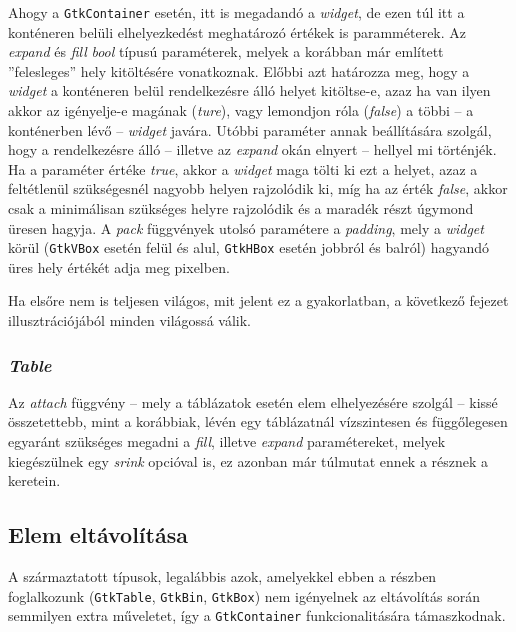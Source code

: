 Ahogy a \texttt{GtkContainer} esetén, itt is megadandó a \textit{widget}, de ezen túl itt a konténeren belüli elhelyezkedést meghatározó értékek is paramméterek. Az \textit{expand} és \textit{fill} \textit{bool} típusú paraméterek, melyek a korábban már említett ''felesleges'' hely kitöltésére vonatkoznak. Előbbi azt határozza meg, hogy a \textit{widget} a konténeren belül rendelkezésre álló helyet kitöltse-e, azaz ha van ilyen akkor az igényelje-e magának (\textit{ture}), vagy lemondjon róla (\textit{false}) a többi -- a konténerben lévő -- \textit{widget} javára. Utóbbi paraméter annak beállítására szolgál, hogy a rendelkezésre álló -- illetve az \textit{expand} okán elnyert -- hellyel mi történjék. Ha a paraméter értéke \textit{true}, akkor a \textit{widget} maga tölti ki ezt a helyet, azaz a feltétlenül szükségesnél nagyobb helyen rajzolódik ki, míg ha az érték \textit{false}, akkor csak a minimálisan szükséges helyre rajzolódik és a maradék részt úgymond üresen hagyja. A \textit{pack} függvények utolsó paramétere a \textit{padding}, mely a \textit{widget} körül (\texttt{GtkVBox} esetén felül és alul, \texttt{GtkHBox} esetén jobbról és balról) hagyandó üres hely értékét adja meg pixelben.

Ha elsőre nem is teljesen világos, mit jelent ez a gyakorlatban, a következő fejezet illusztrációjából minden világossá válik.

\subsubsection{\textit{Table}}

Az \textit{attach} függvény -- mely a táblázatok esetén elem elhelyezésére szolgál -- kissé összetettebb, mint a korábbiak, lévén egy táblázatnál vízszintesen és függőlegesen egyaránt szükséges megadni a \textit{fill}, illetve \textit{expand} paramétereket, melyek kiegészülnek egy \textit{srink} opcióval is, ez azonban már túlmutat ennek a résznek a keretein.

\subsection{Elem eltávolítása}

A származtatott típusok, legalábbis azok, amelyekkel ebben a részben foglalkozunk (\texttt{GtkTable}, \texttt{GtkBin}, \texttt{GtkBox}) nem igényelnek az eltávolítás során semmilyen extra műveletet, így a \texttt{GtkContainer} funkcionalitására támaszkodnak.

